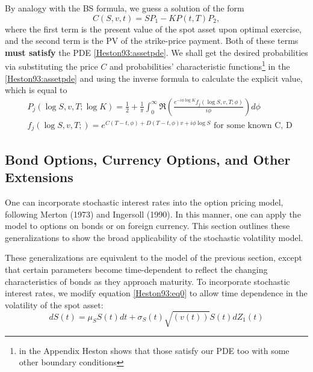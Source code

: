     \begin{frame}
        By analogy with the BS formula, we guess a solution of the form
        \begin{equation}
            C(S, v, t) = S P_1 - KP(t, T)P_2,
        \end{equation}
        where the first term is the present value of the spot asset upon optimal exercise, and 
        the second term is the PV of the strike-price payment. Both of these terms 
        \textbf{must satisfy} the PDE \eqref{Heston93:assetpde}. 
        We shall get the desired probabilities via substituting 
        the price $C$ and probabilities' characteristic functions\footnote{in the Appendix Heston shows that those satisfy our PDE too with some other boundary conditions} in the \eqref{Heston93:assetpde} and using the inverse 
        formula to calculate the explicit value, which is equal to
        \begin{align}
            & P_j(\log S, v, T; \log K) = \frac{1}{2} + \frac{1}{\pi}\int_{0}^{\infty}\Re\left(\frac{e^{-i\phi\log K} f_j(\log S, v, T; \phi)}{i\phi}\right) d\phi \\ 
            & f_j(\log S, v, T; ) = e^{C(T-t, \phi) + D(T-t, \phi)v +i\phi\log S} \text{ for some known C, D}
        \end{align}
    \end{frame}

\subsection{Bond Options, Currency Options, and Other Extensions}

    \begin{frame}
        One  can  incorporate  stochastic  interest  rates  into  the  option  pricing model,
        following  Merton  (1973)  and  Ingersoll  (1990).  In  this  manner,
        one  can  apply  the  model  to  options  on  bonds  or  on  foreign  
        currency. This  section  outlines  these  generalizations  to  show  the  
        broad  applicability  of  the  stochastic  volatility  model.  
        
        These generalizations  are equivalent  to  the  model  of  the  previous  section,  
        except  that  certain parameters  become  time-dependent  to  reflect  the  
        changing  characteristics  of  bonds  as  they  approach  maturity. To  
        incorporate  stochastic  interest  rates,  we  modify  equation  
        \eqref{Heston93:eq0}  to allow  time  dependence  in  the  volatility  of  the  
        spot  asset:
        \begin{equation}\label{Heston93:stspot}
            dS(t) = \mu_S S(t) dt + \sigma_S(t) \sqrt{(v(t))}S(t)  dZ_1(t)
        \end{equation}
    \end{frame}

